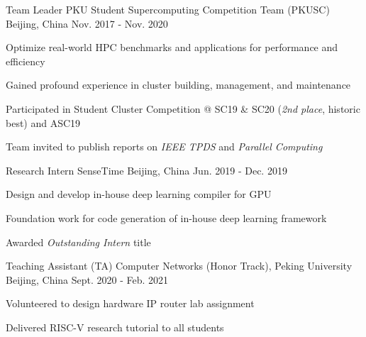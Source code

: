\begin{cventries}
  \cventry
    {Team Leader} %
    {PKU Student Supercomputing Competition Team (PKUSC)} %
    {Beijing, China} %
    {Nov. 2017 - Nov. 2020} %
    {
      \begin{cvitems} %
        \item {Optimize real-world HPC benchmarks and applications for performance and efficiency}
        \item {Gained profound experience in cluster building, management, and maintenance}
        \item {Participated in Student Cluster Competition @ SC19 \& SC20 (\textit{2nd place}, historic best) and ASC19}
        \item {Team invited to publish reports on \textit{IEEE TPDS} and \textit{Parallel Computing}}
      \end{cvitems}
    }

\end{cventries}


\begin{cventries}
    \cventry
    {Research Intern}
    {SenseTime}
    {Beijing, China}
    {Jun. 2019 - Dec. 2019}
    {
        \begin{cvitems}
        \item {Design and develop in-house deep learning compiler for GPU}
        \item {Foundation work for code generation of in-house deep learning framework}
        \item {Awarded \textit{Outstanding Intern} title}
        \end{cvitems}
    }
\end{cventries}


\begin{cventries}
    \cventry
    {Teaching Assistant (TA)}
    {Computer Networks (Honor Track), Peking University}
    {Beijing, China}
    {Sept. 2020 - Feb. 2021}
    {
        \begin{cvitems}
        \item {Volunteered to design hardware IP router lab assignment}
        \item {Delivered RISC-V research tutorial to all students}
        \end{cvitems}
    }
\end{cventries}
